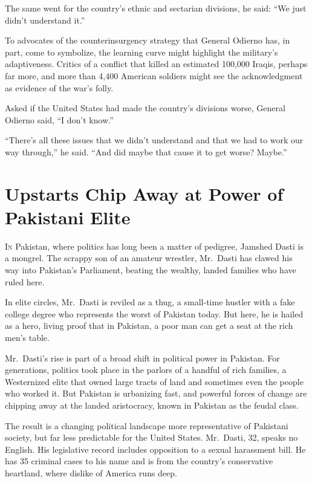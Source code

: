 ﻿\documentclass[12pt]{article}
\begin{document}
The same went for the country's ethnic and sectarian divisions, he said: ``We just didn't understand
it.''

To advocates of the counterinsurgency strategy that General Odierno has, in part, come to symbolize,
the learning curve might highlight the military's adaptiveness. Critics of a conflict that killed an
estimated 100,000 Iraqis, perhaps far more, and more than 4,400 American soldiers might see the
acknowledgment as evidence of the war's folly.

Asked if the United States had made the country's divisions worse, General Odierno said, ``I don't
know.''

``There's all these issues that we didn't understand and that we had to work our way through,'' he
said. ``And did maybe that cause it to get worse? Maybe.''

\pagebreak
\section{Upstarts Chip Away at Power of Pakistani Elite}

\lettrine{I}{n} Pakistan, where politics has long been a matter of pedigree,
Jamshed Dasti is a mongrel. The scrappy son of an amateur wrestler, Mr.~Dasti has clawed his way
into Pakistan's Parliament, beating the wealthy, landed families who have ruled here.

In elite circles, Mr.~Dasti is reviled as a thug, a small-time hustler with a fake college degree
who represents the worst of Pakistan today. But here, he is hailed as a hero, living proof that in
Pakistan, a poor man can get a seat at the rich men's table.

Mr.~Dasti's rise is part of a broad shift in political power in Pakistan. For generations, politics
took place in the parlors of a handful of rich families, a Westernized elite that owned large tracts
of land and sometimes even the people who worked it. But Pakistan is urbanizing fast, and powerful
forces of change are chipping away at the landed aristocracy, known in Pakistan as the feudal class.

The result is a changing political landscape more representative of Pakistani society, but far less
predictable for the United States. Mr.~Dasti, 32, speaks no English. His legislative record includes
opposition to a sexual harassment bill. He has 35 criminal cases to his name and is from the
country's conservative heartland, where dislike of America runs deep.
\end{document}
